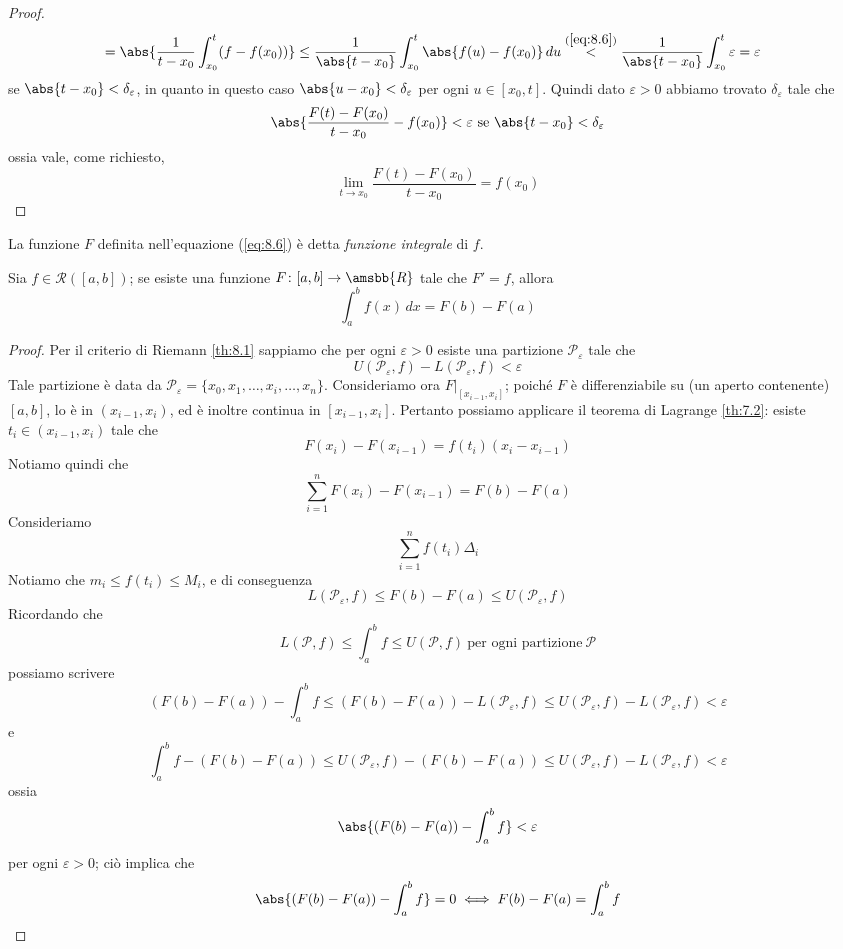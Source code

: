 \begin{proof}
\[\begin{split}
        & = \abs{\frac{1}{t-x_0}\int_{x_0}^t (f-f(x_0))}\le \frac{1}{\abs{t-x_0}}\int_{x_0}^t\abs{f(u)-f(x_0)}\, du \overset{(\ref{eq:8.6})}{<}\frac{1}{\abs{t-x_0}}\int_{x_0}^t \varepsilon = \varepsilon
    \end{split}
    \]
    se $\abs{t-x_0}<\delta_\varepsilon$, in quanto in questo caso $\abs{u-x_0}<\delta_\varepsilon$ per ogni $u\in[x_0,t]$. Quindi dato $\varepsilon>0$ abbiamo trovato $\delta_\varepsilon$ tale che
    \[
    \abs{\frac{F(t)-F(x_0)}{t-x_0}-f(x_0)}<\varepsilon \ \text{se} \ \abs{t-x_0}<\delta_\varepsilon
    \]
    ossia vale, come richiesto, 
    \[
    \lim_{t\to x_0} \frac{F(t)-F(x_0)}{t-x_0} = f(x_0)
    \]
\end{proof}
\begin{remark}
    La funzione $F$ definita nell'equazione (\ref{eq:8.6}) è detta \emph{funzione integrale} di $f$.
\end{remark}
\begin{theorem}
    \label{th:8.3}
    Sia $f\in\mathscr{R}([a,b])$; se esiste una funzione $F\colon[a,b]\to \amsbb{R}$ tale che $F'=f$, allora
    \[
    \int_a^b f(x)\, dx = F(b)-F(a)
    \]
\end{theorem}
\begin{proof}
    Per il criterio di Riemann \ref{th:8.1} sappiamo che per ogni $\varepsilon>0$ esiste una partizione $\mathscr{P}_\varepsilon$ tale che 
    \[
    U(\mathscr{P}_\varepsilon, f) - L(\mathscr{P}_\varepsilon, f)<\varepsilon
    \]
    Tale partizione è data da $\mathscr{P}_\varepsilon = \{x_0, x_1, \dots, x_i, \dots, x_n\}$. Consideriamo ora $F\Big|_{[x_{i-1}, x_i]}$; poiché $F$ è differenziabile su (un aperto contenente) $[a,b]$, lo è in $(x_{i-1}, x_i)$, ed è inoltre continua in $[x_{i-1}, x_i]$. Pertanto possiamo applicare il teorema di Lagrange \ref{th:7.2}: esiste $t_i\in(x_{i-1}, x_i)$ tale che
    \[
    F(x_i) -F(x_{i-1}) = f(t_i) (x_i - x_{i-1})
    \]
    Notiamo quindi che
    \[
    \sum_{i=1}^n F(x_i) -F(x_{i-1}) = F(b)-F(a)
    \]
    Consideriamo
    \[
    \sum_{i=1}^nf(t_i) \Delta_i
    \]
    Notiamo che $m_i \le f(t_i) \le M_i $, e di conseguenza
    \[
    L(\mathscr{P}_\varepsilon, f) \le F(b)-F(a) \le U(\mathscr{P}_\varepsilon, f)
    \]
    Ricordando che 
    \[
    L(\mathscr{P}, f) \le \int_a^b f \le U(\mathscr{P}, f) \ \text{per ogni partizione}\ \mathscr{P}
    \]
    possiamo scrivere
    \[
    \left(F(b)-F(a)\right)-\int_a^bf \le \left(F(b)-F(a)\right)-L(\mathscr{P}_\varepsilon, f) \le U(\mathscr{P}_\varepsilon, f)-L(\mathscr{P}_\varepsilon, f) < \varepsilon
    \]
    e
    \[
    \int_a^b f -\left(F(b)-F(a)\right)\le U(\mathscr{P}_\varepsilon, f) - \left(F(b)-F(a)\right) \le U(\mathscr{P}_\varepsilon, f) - L(\mathscr{P}_\varepsilon, f) <\varepsilon
    \]
    ossia
    \[
    \abs{\left(F(b)-F(a)\right)-\int_a^bf}<\varepsilon
    \]
    per ogni $\varepsilon>0$; ciò implica che
    \[
    \abs{\left(F(b)-F(a)\right)-\int_a^bf} = 0 \iff F(b)-F(a)=\int_a^bf
    \]
\end{proof}
